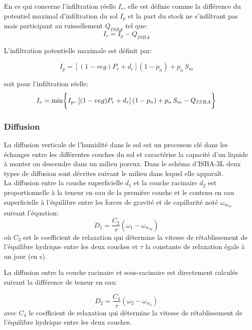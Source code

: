 \noindent En ce qui concerne l'infiltration réelle $I_{r}$, elle est définie comme la différence du potentiel maximal d'infiltration du sol $I_{p}$ et la part du stock ne s'infiltrant pas mais participant au ruissellement $Q_{ISBA}$ tel que:
\begin{equation} \label{eq_infiltration}
I_{r}=I_{p}-Q_{ISBA}
\end{equation}

L'infiltration potentielle maximale est définit par:

\begin{equation}
I_{p} = \left[(1-veg)P_r + d_r\right]\left(1-p_n\right)+ p_n \,S_m
\end{equation}

soit pour l'infiltration réelle:
\begin{equation}
I_{r}={\rm min}\bigg\lbrace
I_{p}, \,
\left[(1-veg)P_r + d_r
\right]\left(1-p_n\right)
+ p_n \,S_m
-Q_{ISBA}
\bigg\rbrace
\end{equation}

\subsubsection{{\selectfont Diffusion}}
%
La diffusion verticale de l'humidité dans le sol est un processus clé dans les échanges entre les différentes couches du sol et caractérise la capacité d'un liquide à monter ou descendre dans un milieu poreux. Dans le schéma d'ISBA-3L deux types de diffusion sont décrites suivant le milieu dans lequel elle apparaît.\\ 
La diffusion entre la couche superficielle $d_{1}$ et la couche racinaire $d_{2}$ est proportionnelle à la teneur en eau de la première couche et le contenu en eau superficielle à l'équilibre entre les forces de gravité et de capillarité noté $\omega_{w_{eq}}$ suivant l'équation:
\begin{equation}
D_{1} = \frac{C_{2}}{\tau}(\omega_{1}-\omega_{w_{eq}})
\end{equation}
où $C_{2}$ est le coefficient de relaxation qui détermine la vitesse de rétablissement de l'équilibre hydrique entre les deux couches et $\tau$ la constante de relaxation égale à un jour (en s).

La diffusion entre la couche racinaire et sous-racinaire est directement calculée suivant la différence de teneur en eau:

\begin{equation}
D_{2} = \frac{C_{4}}{\tau}(\omega_{2}-\omega_{w_{3}})
\end{equation}
avec $C_{4}$ le coefficient de relaxation qui détermine la vitesse de rétablissement de l'équilibre hydrique entre les deux couches.

